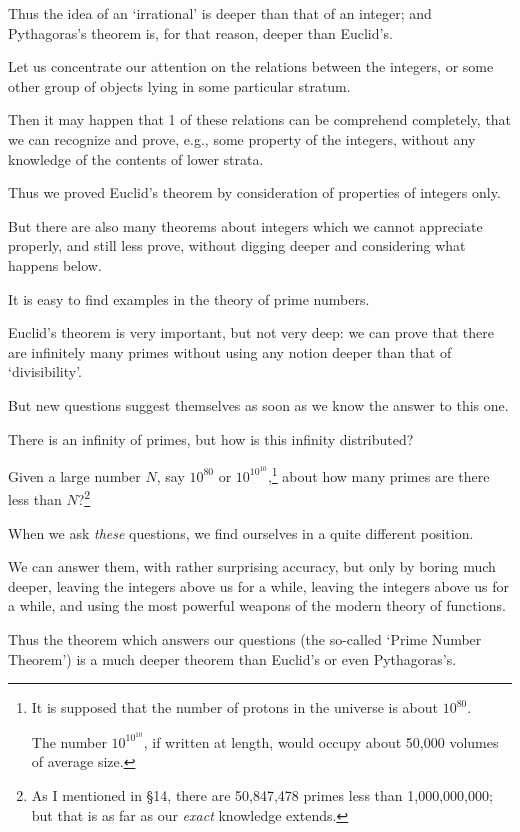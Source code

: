 \documentclass{article}
\numberwithin{equation}{section}
\begin{document}

Thus the idea of an `irrational' is deeper than that of an integer; and Pythagoras's theorem is, for that reason, deeper than Euclid's.

%
Let us concentrate our attention on the relations between the integers, or some other group of objects lying in some particular stratum.

Then it may happen that 1 of these relations can be comprehend completely, that we can recognize and prove, e.g., some property of the integers, without any knowledge of the contents of lower strata.

Thus we proved Euclid's theorem by consideration of properties of integers only.

But there are also many theorems about integers which we cannot appreciate properly, and still less prove, without digging deeper and considering what happens below.

%
It is easy to find examples in the theory of prime numbers.

Euclid's theorem is very important, but not very deep: we can prove that there are infinitely many primes without using any notion deeper than that of `divisibility'.

But new questions suggest themselves as soon as we know the answer to this one.

There is an infinity of primes, but how is this infinity distributed?

Given a large number $N$, say $10^80$ or $10^{10^10}$,\footnote{It is supposed that the number of protons in the universe is about $10^80$.

The number $10^{10^10}$, if written at length, would occupy about 50,000 volumes of average size.} about how many primes are there less than $N$?\footnote{As I mentioned in \S14, there are 50,847,478 primes less than 1,000,000,000; but that is as far as our \textit{exact} knowledge extends.}

When we ask \textit{these} questions, we find ourselves in a quite different position.

We can answer them, with rather surprising accuracy, but only by boring much deeper, leaving the integers above us for a while, leaving the integers above us for a while, and using the most powerful weapons of the modern theory of functions.

Thus the theorem which answers our questions (the so-called `Prime Number Theorem') is a much deeper theorem than Euclid's or even Pythagoras's.
\end{document}
